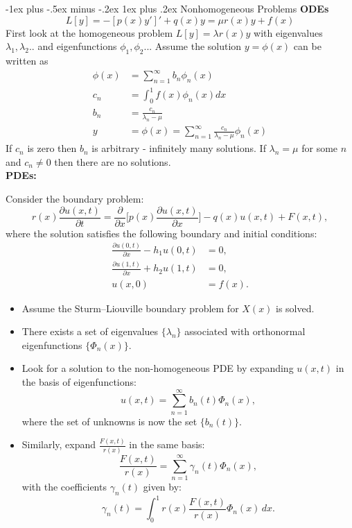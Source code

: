 \documentclass[10pt,landscape]{article}
\makeatletter
\newcommand{\lb}{\lambda}
\newcommand{\f}{\frac}
\renewcommand{\subsubsection}{\@startsection{subsubsection}{3}{0mm}%
                                {-1ex plus -.5ex minus -.2ex}%
                                {1ex plus .2ex}%
                                {\normalfont\small\bfseries}}
\makeatother
\begin{document}
\begin{multicols}{2}
\subsubsection{Nonhomogeneous Problems}
\textbf{ODEs}
		$$ L[y] = -[ p(x)y']'  + q(x)y = \mu r(x)y + f(x) $$
		First look at the homogeneous problem $L[y] = \lb r(x)y$ with eigenvalues $\lb_1,\lb_2..$ and eigenfunctions $\phi_1,\phi_2...$ Assume the solution $y= \phi(x)$ can be written as 
		\begin{align*}
			\phi(x) &= \sum_{n=1}^{\infty} b_n\phi_n(x) \\
			c_n &= \int_0^1 f(x)\phi_n(x)dx \\
			b_n &= \f{c_n}{\lb_n - \mu} \\
			y &= \phi(x) = \sum_{n=1}^{\infty} \f{c_n}{\lb_n - \mu}\phi_n(x)
		\end{align*}
		If $c_n$ is zero then $b_n$ is arbitrary - infinitely many solutions. If $\lb_n = \mu$ for some $n$ and $c_n \neq 0 $ then there are no solutions. \\
\medskip
\textbf{PDEs:}

Consider the boundary problem:\\
$$
r(x) \frac{\partial u(x, t)}{\partial t} = \frac{\partial}{\partial x} \big[p(x) \frac{\partial u(x, t)}{\partial x}\big] - q(x) u(x, t) + F(x, t),
$$
where the solution satisfies the following boundary and initial conditions:\\
\begin{align*}
    \frac{\partial u(0, t)}{\partial x} - h_1 u(0, t) &= 0, \\
    \frac{\partial u(1, t)}{\partial x} + h_2 u(1, t) &= 0, \\
    u(x, 0) &= f(x).
\end{align*}


\begin{itemize}
    \item Assume the Sturm–Liouville boundary problem for \(X(x)\) is solved.
    \item There exists a set of eigenvalues \(\{\lambda_n\}\) associated with orthonormal eigenfunctions \(\{\Phi_n(x)\}\).
    \item Look for a solution to the non-homogeneous PDE by expanding \(u(x, t)\) in the basis of eigenfunctions:\\
    \[
    u(x, t) = \sum_{n=1}^\infty b_n(t)\Phi_n(x),
    \]
    where the set of unknowns is now the set \(\{b_n(t)\}\).
    \item Similarly, expand \(\frac{F(x, t)}{r(x)}\) in the same basis:\\
    \[
    \frac{F(x, t)}{r(x)} = \sum_{n=1}^\infty \gamma_n(t)\Phi_n(x),
    \]
    with the coefficients \(\gamma_n(t)\) given by:\\
    \[
    \gamma_n(t) = \int_0^1 r(x) \frac{F(x, t)}{r(x)} \Phi_n(x) \, dx.
    \]
\end{itemize}



\end{multicols}
\end{document}
